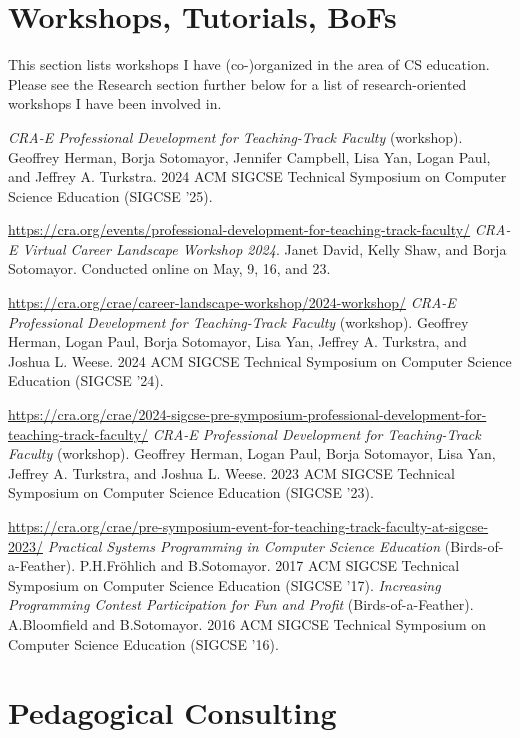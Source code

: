\documentclass{resume}
\begin{document}
\section*{\hspace{-1cm}Workshops, Tutorials, BoFs}

This section lists workshops I have (co-)organized in the area of CS education. Please see the Research section further below for a list of research-oriented workshops I have been involved in.

\begin{category}{}
\citembullet \emph{CRA-E Professional Development for Teaching-Track Faculty} (workshop). Geoffrey Herman, Borja Sotomayor, Jennifer Campbell, Lisa Yan, Logan Paul, and Jeffrey A. Turkstra. 2024 ACM SIGCSE Technical Symposium on Computer Science Education (SIGCSE '25).

\url{https://cra.org/events/professional-development-for-teaching-track-faculty/}
\citembullet \emph{CRA-E Virtual Career Landscape Workshop 2024}. Janet David, Kelly Shaw, and Borja Sotomayor. Conducted online on May, 9, 16, and 23.

\url{https://cra.org/crae/career-landscape-workshop/2024-workshop/}
\citembullet \emph{CRA-E Professional Development for Teaching-Track Faculty} (workshop). Geoffrey Herman, Logan Paul, Borja Sotomayor, Lisa Yan, Jeffrey A. Turkstra, and Joshua L. Weese. 2024 ACM SIGCSE Technical Symposium on Computer Science Education (SIGCSE '24).

\url{https://cra.org/crae/2024-sigcse-pre-symposium-professional-development-for-teaching-track-faculty/}
\citembullet \emph{CRA-E Professional Development for Teaching-Track Faculty} (workshop). Geoffrey Herman, Logan Paul, Borja Sotomayor, Lisa Yan, Jeffrey A. Turkstra, and Joshua L. Weese. 2023 ACM SIGCSE Technical Symposium on Computer Science Education (SIGCSE '23).

\url{https://cra.org/crae/pre-symposium-event-for-teaching-track-faculty-at-sigcse-2023/}
\citembullet \emph{Practical Systems Programming in Computer Science Education} (Birds-of-a-Feather). P.H.Fröhlich and B.Sotomayor. 2017 ACM SIGCSE Technical Symposium on Computer Science Education (SIGCSE '17).
\citembullet \emph{Increasing Programming Contest Participation for Fun and Profit} (Birds-of-a-Feather). A.Bloomfield and B.Sotomayor. 2016 ACM SIGCSE Technical Symposium on Computer Science Education (SIGCSE '16).
\end{category}

\section*{\hspace{-1cm}Pedagogical Consulting}
\end{document}
